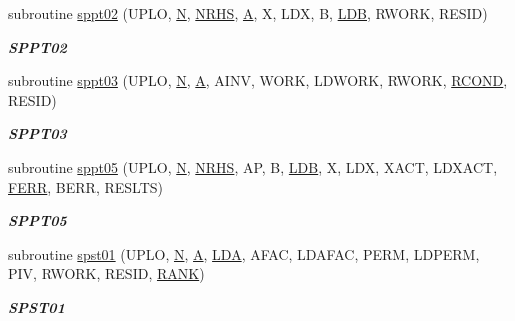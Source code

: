 \begin{DoxyCompactItemize}
subroutine \hyperlink{group__single__lin_ga5d254684417d51e30cc3effbb238eebb}{sppt02} (U\+P\+L\+O, \hyperlink{polmisc_8c_a0240ac851181b84ac374872dc5434ee4}{N}, \hyperlink{example__user_8c_aa0138da002ce2a90360df2f521eb3198}{N\+R\+H\+S}, \hyperlink{classA}{A}, X, L\+D\+X, B, \hyperlink{example__user_8c_a50e90a7104df172b5a89a06c47fcca04}{L\+D\+B}, R\+W\+O\+R\+K, R\+E\+S\+I\+D)
\begin{DoxyCompactList}\small\item\em {\bfseries S\+P\+P\+T02} \end{DoxyCompactList}\item 
subroutine \hyperlink{group__single__lin_gab917ea72fc42c77d380c5e89732cd5b8}{sppt03} (U\+P\+L\+O, \hyperlink{polmisc_8c_a0240ac851181b84ac374872dc5434ee4}{N}, \hyperlink{classA}{A}, A\+I\+N\+V, W\+O\+R\+K, L\+D\+W\+O\+R\+K, R\+W\+O\+R\+K, \hyperlink{superlu__enum__consts_8h_af00a42ecad444bbda75cde1b64bd7e72a9b5c151728d8512307565994c89919d5}{R\+C\+O\+N\+D}, R\+E\+S\+I\+D)
\begin{DoxyCompactList}\small\item\em {\bfseries S\+P\+P\+T03} \end{DoxyCompactList}\item 
subroutine \hyperlink{group__single__lin_ga259ceb37e9c2611ae2bba0e0400d8a15}{sppt05} (U\+P\+L\+O, \hyperlink{polmisc_8c_a0240ac851181b84ac374872dc5434ee4}{N}, \hyperlink{example__user_8c_aa0138da002ce2a90360df2f521eb3198}{N\+R\+H\+S}, A\+P, B, \hyperlink{example__user_8c_a50e90a7104df172b5a89a06c47fcca04}{L\+D\+B}, X, L\+D\+X, X\+A\+C\+T, L\+D\+X\+A\+C\+T, \hyperlink{superlu__enum__consts_8h_af00a42ecad444bbda75cde1b64bd7e72a78fd14d7abebae04095cfbe02928f153}{F\+E\+R\+R}, B\+E\+R\+R, R\+E\+S\+L\+T\+S)
\begin{DoxyCompactList}\small\item\em {\bfseries S\+P\+P\+T05} \end{DoxyCompactList}\item 
subroutine \hyperlink{group__single__lin_gadd6293407c7472b5988ae889e331cd08}{spst01} (U\+P\+L\+O, \hyperlink{polmisc_8c_a0240ac851181b84ac374872dc5434ee4}{N}, \hyperlink{classA}{A}, \hyperlink{example__user_8c_ae946da542ce0db94dced19b2ecefd1aa}{L\+D\+A}, A\+F\+A\+C, L\+D\+A\+F\+A\+C, P\+E\+R\+M, L\+D\+P\+E\+R\+M, P\+I\+V, R\+W\+O\+R\+K, R\+E\+S\+I\+D, \hyperlink{splinemodule_8c_a3a88bcc63386de30443dacede2e01847}{R\+A\+N\+K})
\begin{DoxyCompactList}\small\item\em {\bfseries S\+P\+S\+T01} \end{DoxyCompactList}\item 

\end{DoxyCompactItemize}
